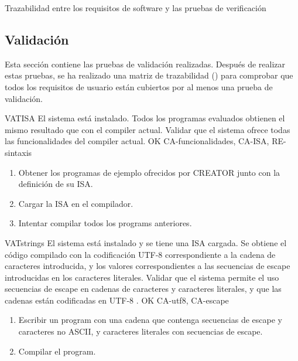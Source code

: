 \begin{landscape}
        {Trazabilidad entre los requisitos de software y las pruebas de verificación}
\end{landscape}

\FloatBarrier

\subsection{Validación}\label{subsec:validation}

Esta sección contiene las pruebas de validación realizadas. Después de realizar
estas pruebas, se ha realizado una matriz de trazabilidad
() para comprobar que todos los requisitos de
usuario están cubiertos por al menos una prueba de validación.

\begin{testCase}{VAT}{ISA}
    {El sistema está instalado.} %
    {Todos los programas evaluados obtienen el mismo resultado que con el \gls{compiler} actual.} %
    {Validar que el sistema ofrece todas las funcionalidades del \gls{compiler} actual.} %
    {OK} %
    {CA-funcionalidades, CA-ISA, RE-sintaxis} %
    \begin{enumerate}[leftmargin=*, topsep=0pt, noitemsep] %
        \item Obtener los programas de ejemplo ofrecidos por CREATOR junto con
        la definición de su \gls{ISA}.
        \item Cargar la \gls{ISA} en el compilador.
        \item Intentar compilar todos los \glspl{program} anteriores.
    \end{enumerate}
\end{testCase}

\begin{testCase}{VAT}{strings}
    {El sistema está instalado y se tiene una \gls{ISA} cargada.} %
    {Se obtiene el código compilado con la codificación UTF-8 \parencite{UTF-8}
    correspondiente a la cadena de caracteres introducida, y los valores
    correspondientes a las secuencias de escape introducidas en los caracteres
    literales.} %
    {Validar que el sistema permite el uso secuencias de escape en cadenas de
    caracteres y caracteres literales, y que las cadenas están codificadas en
    UTF-8 \parencite{UTF-8}.} %
    {OK} %
    {CA-utf8, CA-escape} %
    \begin{enumerate}[leftmargin=*, topsep=0pt, noitemsep] %
        \item Escribir un \gls{program} con una cadena que contenga
        secuencias de escape y caracteres no ASCII, y caracteres
        literales con secuencias de escape.
        \item Compilar el \gls{program}.
    \end{enumerate}
\end{testCase}


